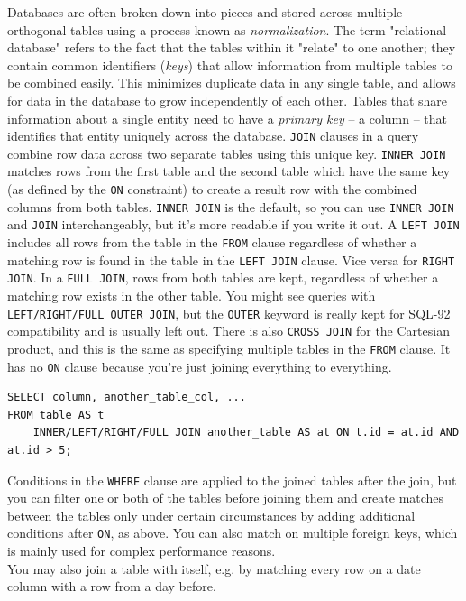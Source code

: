 \documentclass[table, xcdraw]{article}%
\begin{document}
Databases are often broken down into pieces and stored across multiple orthogonal tables using a process known as \emph{normalization}. The term "relational database" refers to the fact that the tables within it "relate" to one another; they contain common identifiers (\emph{keys}) that allow information from multiple tables to be combined easily. This minimizes duplicate data in any single table, and allows for data in the database to grow independently of each other. Tables that share information about a single entity need to have a \emph{primary key} -- a column -- that identifies that entity uniquely across the database. \texttt{JOIN} clauses in a query combine row data across two separate tables using this unique key. \texttt{INNER JOIN} matches rows from the first table and the second table which have the same key (as defined by the \texttt{ON} constraint) to create a result row with the combined columns from both tables. \texttt{INNER JOIN} is the default, so you can use \texttt{INNER JOIN} and \texttt{JOIN} interchangeably, but it's more readable if you write it out. A \texttt{LEFT JOIN} includes all rows from the table in the \texttt{FROM} clause regardless of whether a matching row is found in the table in the \texttt{LEFT JOIN} clause. Vice versa for \texttt{RIGHT JOIN}. In a \texttt{FULL JOIN}, rows from both tables are kept, regardless of whether a matching row exists in the other table. You might see queries with \texttt{LEFT/RIGHT/FULL OUTER JOIN}, but the \texttt{OUTER} keyword is really kept for SQL-92 compatibility and is usually left out. There is also \texttt{CROSS JOIN} for the Cartesian product, and this is the same as specifying multiple tables in the \texttt{FROM} clause. It has no \texttt{ON} clause because you're just joining everything to everything.

\begin{verbatim}
SELECT column, another_table_col, ...
FROM table AS t
    INNER/LEFT/RIGHT/FULL JOIN another_table AS at ON t.id = at.id AND at.id > 5;
\end{verbatim}

Conditions in the \texttt{WHERE} clause are applied to the joined tables after the join, but you can filter one or both of the tables before joining them and create matches between the tables only under certain circumstances by adding additional conditions after \texttt{ON}, as above. You can also match on multiple foreign keys, which is mainly used for complex performance reasons.\\
You may also join a table with itself, e.g. by matching every row on a date column with a row from a day before.
\end{document}
